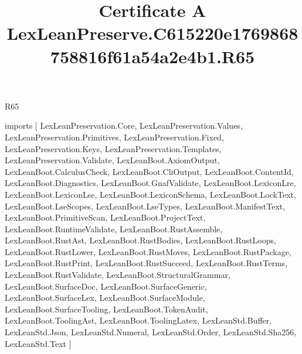 \begin{lexlean}{R65}
\title{Certificate A LexLeanPreserve.C615220e1769868758816f61a54a2e4b1.R65}
\begin{coremodule}
imports [
  LexLeanPreservation.Core,
  LexLeanPreservation.Values,
  LexLeanPreservation.Primitives,
  LexLeanPreservation.Fixed,
  LexLeanPreservation.Keys,
  LexLeanPreservation.Templates,
  LexLeanPreservation.Validate,
  LexLeanBoot.AxiomOutput,
  LexLeanBoot.CalculusCheck,
  LexLeanBoot.CliOutput,
  LexLeanBoot.ContentId,
  LexLeanBoot.Diagnostics,
  LexLeanBoot.GnafValidate,
  LexLeanBoot.LexiconLre,
  LexLeanBoot.LexiconLse,
  LexLeanBoot.LexiconSchema,
  LexLeanBoot.LockText,
  LexLeanBoot.LseScopes,
  LexLeanBoot.LseTypes,
  LexLeanBoot.ManifestText,
  LexLeanBoot.PrimitiveScan,
  LexLeanBoot.ProjectText,
  LexLeanBoot.RuntimeValidate,
  LexLeanBoot.RustAssemble,
  LexLeanBoot.RustAst,
  LexLeanBoot.RustBodies,
  LexLeanBoot.RustLoops,
  LexLeanBoot.RustLower,
  LexLeanBoot.RustMoves,
  LexLeanBoot.RustPackage,
  LexLeanBoot.RustPrint,
  LexLeanBoot.RustSucceed,
  LexLeanBoot.RustTerms,
  LexLeanBoot.RustValidate,
  LexLeanBoot.StructuralGrammar,
  LexLeanBoot.SurfaceDoc,
  LexLeanBoot.SurfaceGeneric,
  LexLeanBoot.SurfaceLex,
  LexLeanBoot.SurfaceModule,
  LexLeanBoot.SurfaceTooling,
  LexLeanBoot.TokenAudit,
  LexLeanBoot.ToolingAst,
  LexLeanBoot.ToolingLatex,
  LexLeanStd.Buffer,
  LexLeanStd.Json,
  LexLeanStd.Numeral,
  LexLeanStd.Order,
  LexLeanStd.Sha256,
  LexLeanStd.Text
]


\end{coremodule}
\end{lexlean}
